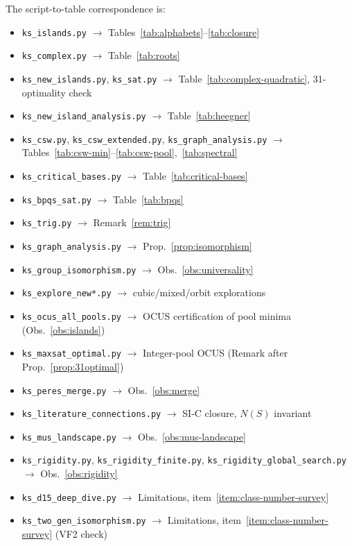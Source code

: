 \documentclass[12pt,a4paper]{article}
\begin{document}
\begin{sloppypar}
\noindent The script-to-table correspondence is:
\begin{itemize}\setlength{\itemsep}{0pt}\setlength{\parskip}{0pt}
\item \texttt{ks\_islands.py} $\to$ Tables~\ref{tab:alphabets}--\ref{tab:closure}
\item \texttt{ks\_complex.py} $\to$ Table~\ref{tab:roots}
\item \texttt{ks\_new\_islands.py}, \texttt{ks\_sat.py} $\to$ Table~\ref{tab:complex-quadratic}, 31-optimality check
\item \texttt{ks\_new\_island\_analysis.py} $\to$ Table~\ref{tab:heegner}
\item \texttt{ks\_csw.py}, \texttt{ks\_csw\_extended.py}, \texttt{ks\_graph\_analysis.py} $\to$ Tables~\ref{tab:csw-min}--\ref{tab:csw-pool},~\ref{tab:spectral}
\item \texttt{ks\_critical\_bases.py} $\to$ Table~\ref{tab:critical-bases}
\item \texttt{ks\_bpqs\_sat.py} $\to$ Table~\ref{tab:bpqs}
\item \texttt{ks\_trig.py} $\to$ Remark~\ref{rem:trig}
\item \texttt{ks\_graph\_analysis.py} $\to$ Prop.~\ref{prop:isomorphism}
\item \texttt{ks\_group\_isomorphism.py} $\to$ Obs.~\ref{obs:universality}
\item \texttt{ks\_explore\_new*.py} $\to$ cubic/mixed/orbit explorations
\item \texttt{ks\_ocus\_all\_pools.py} $\to$ OCUS certification of pool minima (Obs.~\ref{obs:islands})
\item \texttt{ks\_maxsat\_optimal.py} $\to$ Integer-pool OCUS (Remark after Prop.~\ref{prop:31optimal})
\item \texttt{ks\_peres\_merge.py} $\to$ Obs.~\ref{obs:merge}
\item \texttt{ks\_literature\_connections.py} $\to$ SI-C closure, $N(S)$ invariant
\item \texttt{ks\_mus\_landscape.py} $\to$ Obs.~\ref{obs:mus-landscape}
\item \texttt{ks\_rigidity.py}, \texttt{ks\_rigidity\_finite.py}, \texttt{ks\_rigidity\_global\_search.py} $\to$ Obs.~\ref{obs:rigidity}
\item \texttt{ks\_d15\_deep\_dive.py} $\to$ Limitations, item~\ref{item:class-number-survey}
\item \texttt{ks\_two\_gen\_isomorphism.py} $\to$ Limitations, item~\ref{item:class-number-survey} (VF2 check)

\end{itemize}
\end{sloppypar}
\end{document}
